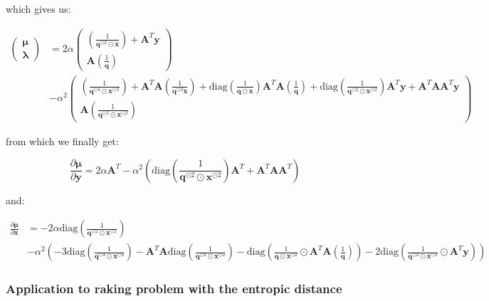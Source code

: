 \documentclass{tex/note}
\begin{document}
which gives us:

\begin{align*}
\begin{pmatrix} \bm{\mu} \\ \bm{\lambda} \end{pmatrix} &= 2 \alpha \begin{pmatrix} \left( \frac{1}{\bm{q}^{\odot 2} \odot \bm{x}} \right) + \bm{A}^T \bm{y} \\ \bm{A} \left( \frac{1}{\bm{q}} \right) \end{pmatrix} \\
&- \alpha^2 \begin{pmatrix} \left( \frac{1}{\bm{q}^{\odot 4} \odot \bm{x}^{\odot 3}} \right) + \bm{A}^T \bm{A} \left( \frac{1}{\bm{q}^{\odot 2} \bm{x}} \right) + \text{diag} \left( \frac{1}{\bm{q} \odot \bm{x}} \right) \bm{A}^T \bm{A} \left( \frac{1}{\bm{q}} \right) + \text{diag} \left( \frac{1}{\bm{q}^{\odot 2} \odot \bm{x}^{\odot 2}} \right) \bm{A}^T \bm{y} + \bm{A}^T \bm{A} \bm{A}^T \bm{y} \\ \bm{A} \left( \frac{1}{\bm{q}^{\odot 3} \odot \bm{x}^{\odot 2}} \right) \end{pmatrix}
\end{align*}

from which we finally get:

\begin{equation*}
\frac{\partial \bm{\mu}}{\partial \bm{y}} = 2 \alpha \bm{A}^T - \alpha^2 \left( \text{diag} \left( \frac{1}{\bm{q}^{\odot 2} \odot \bm{x}^{\odot 2}} \right) \bm{A}^T + \bm{A}^T \bm{A} \bm{A}^T \right)
\end{equation*}

and:

\begin{align*}
\frac{\partial \bm{\mu}}{\partial \bm{x}} &= - 2 \alpha \text{diag} \left( \frac{1}{\bm{q}^{\odot 2} \odot \bm{x}^{\odot 2}} \right) \\
&- \alpha^2 \left( - 3 \text{diag} \left( \frac{1}{\bm{q}^{\odot 4} \odot \bm{x}^{\odot 4}} \right) - \bm{A}^T \bm{A} \text{diag} \left( \frac{1}{\bm{q}^{\odot 2} \odot \bm{x}^{\odot 2}} \right) - \text{diag} \left( \frac{1}{\bm{q} \odot \bm{x}^{\odot 2}} \odot \bm{A}^T \bm{A} \left( \frac{1}{\bm{q}} \right) \right) - 2 \text{diag} \left( \frac{1}{\bm{q}^{\odot 2} \odot \bm{x}^{\odot 3}} \odot \bm{A}^T \bm{y} \right) \right)
\end{align*}

\subsubsection{Application to raking problem with the entropic distance}
\end{document}
